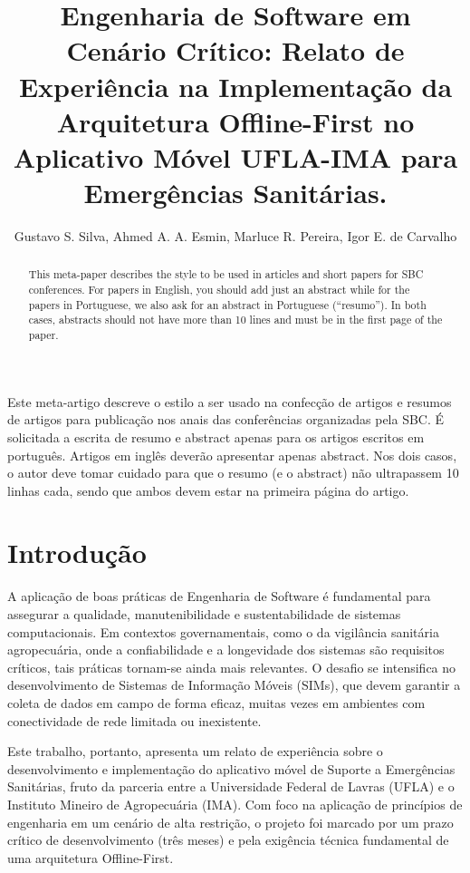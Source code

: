 \documentclass[12pt]{article}
\title{Engenharia de Software em Cenário Crítico: Relato de Experiência na Implementação
da Arquitetura Offline-First no Aplicativo Móvel UFLA-IMA para Emergências Sanitárias.}
\author{
  Gustavo S. Silva\inst{1}, 
  Ahmed A. A. Esmin\inst{1}, 
  Marluce R. Pereira\inst{1}, 
  Igor E. de Carvalho\inst{1}
}
\begin{document}
 

\maketitle

\begin{abstract}
  This meta-paper describes the style to be used in articles and short papers
  for SBC conferences. For papers in English, you should add just an abstract
  while for the papers in Portuguese, we also ask for an abstract in
  Portuguese (``resumo''). In both cases, abstracts should not have more than
  10 lines and must be in the first page of the paper.
\end{abstract}
     
\begin{resumo} 
  Este meta-artigo descreve o estilo a ser usado na confecção de artigos e
  resumos de artigos para publicação nos anais das conferências organizadas
  pela SBC. É solicitada a escrita de resumo e abstract apenas para os artigos
  escritos em português. Artigos em inglês deverão apresentar apenas abstract.
  Nos dois casos, o autor deve tomar cuidado para que o resumo (e o abstract)
  não ultrapassem 10 linhas cada, sendo que ambos devem estar na primeira
  página do artigo.
\end{resumo}


\section{Introdução}

A aplicação de boas práticas de Engenharia de Software é fundamental para assegurar a qualidade, 
manutenibilidade e sustentabilidade de sistemas computacionais. Em contextos governamentais, como 
o da vigilância sanitária agropecuária, onde a confiabilidade e a longevidade dos sistemas são 
requisitos críticos, tais práticas tornam-se ainda mais relevantes. O desafio se intensifica no 
desenvolvimento de Sistemas de Informação Móveis (SIMs), que devem garantir a coleta de dados em 
campo de forma eficaz, muitas vezes em ambientes com conectividade de rede limitada ou inexistente.

Este trabalho, portanto, apresenta um relato de experiência sobre o desenvolvimento e implementação do aplicativo móvel de Suporte a Emergências Sanitárias, fruto da parceria entre a Universidade Federal de Lavras (UFLA) e o Instituto Mineiro de Agropecuária (IMA). Com foco na aplicação de princípios de engenharia em um cenário de alta restrição, o projeto foi marcado por um prazo crítico de desenvolvimento (três meses) e pela exigência técnica fundamental de uma arquitetura Offline-First.
\end{document}
